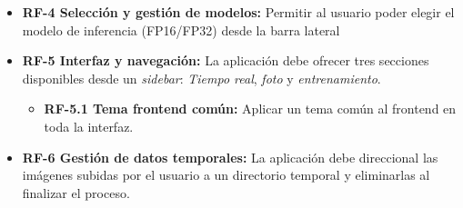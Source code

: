 \begin{itemize}
\begin{itemize}
            \item \textbf{RF-3.1 Definir número de clases:} Permitir al usuario poder definir la cantidad de clases que necesite para clasificar en un rango entre 2 y 26 y poder subir múltiples imágenes por clase y añadir un nombre a cada clase.
            \item \textbf{RF-3.2 Configurar hiperparámetros:} Permitir al usuario configurar hiperparámetros como \textit{epochs}, \textit{batch size} y \textit{learning rate} dentro de unos rangos controlados por tres \textit{sliders}.
            \item \textbf{RF-3.3 Entrenar un modelo CNN:} Permitir al usuario poder entrenar el modelo con su respectivo conjunto de datos.
            \item \textbf{RF-3.4 Mostrar progreso:} Permitir al usuario saber en todo momento a través de una barra de progreso y gráfica en vivo de \textit{train/val accuracy}.
            \item \textbf{RF-3.5 Permitir descarga:} Permitir al usuario descargar un comprimido (\textit{.zip}) que contiene su modelo sin optimizar (\textit{.h5}), un modelo ya optimizado a \textit{TFlite} y las etiquetas en un fichero de texto.            
        \end{itemize}

    \item \textbf{RF-4 Selección y gestión de modelos:} Permitir al usuario poder elegir el modelo de inferencia (FP16/FP32) desde la barra lateral

    \item \textbf{RF-5 Interfaz y navegación:} La aplicación debe ofrecer tres secciones disponibles desde un \textit{sidebar}: \textit{Tiempo real}, \textit{foto} y \textit{entrenamiento}.
        \begin{itemize}
            \item \textbf{RF-5.1 Tema frontend común:} Aplicar un tema común al frontend en toda la interfaz.
        \end{itemize}

    \item \textbf{RF-6 Gestión de datos temporales:} La aplicación debe direccional las imágenes subidas por el usuario a un directorio temporal y eliminarlas al finalizar el proceso.
\end{itemize}

